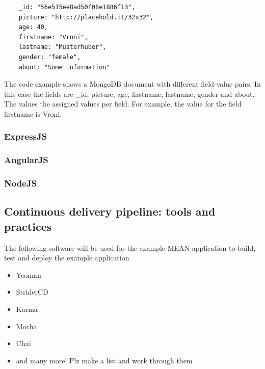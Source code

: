 \begin{verbatim}
    _id: "56e515ee8ad50f08e1886f13",
    picture: "http://placehold.it/32x32",
    age: 40,
    firstname: "Vroni",
    lastname: "Musterhuber",
    gender: "female",
    about: "Some information"
\end{verbatim}

The code example shows a MongoDB document with different field-value pairs. In this case the fields are _id, picture, age, firstname, lastname, gender and
about. The values the assigned values per field. For example, the value for the field firstname is Vroni.


\subsubsection{ExpressJS}

\subsubsection{AngularJS}

\subsubsection{NodeJS}


\subsection{Continuous delivery pipeline: tools and practices}
The following software will be used for the example MEAN application to build, test and deploy the example application

\begin{itemize}
  \item Yeoman
  \item StriderCD
  \item Karma
  \item Mocha
  \item Chai
  \item and many more! Plz make a list and work through them
\end{itemize}

